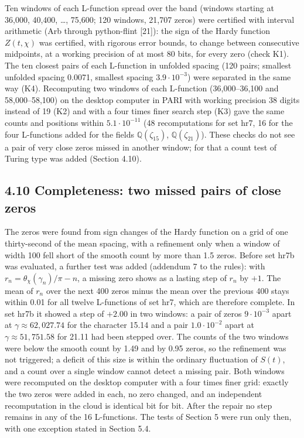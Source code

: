 \documentclass[
  10pt,
]{article}
\begin{document}
Ten windows of each L-function spread over the band (windows starting at
36,000, 40,400, \ldots, 75,600; 120 windows, 21,707 zeros) were
certified with interval arithmetic (Arb through python-flint {[}21{]}):
the sign of the Hardy function \(Z(t, \chi)\) was certified, with
rigorous error bounds, to change between consecutive midpoints, at a
working precision of at most 80 bits, for every zero (check K1). The ten
closest pairs of each L-function in unfolded spacing (120 pairs;
smallest unfolded spacing 0.0071, smallest spacing \(3.9\cdot10^{-3}\))
were separated in the same way (K4). Recomputing two windows of each
L-function (36,000--36,100 and 58,000--58,100) on the desktop computer
in PARI with working precision 38 digits instead of 19 (K2) and with a
four times finer search step (K3) gave the same counts and positions
within \(5.1\cdot10^{-11}\) (48 recomputations for set hr7, 16 for the
four L-functions added for the fields \(\mathbb{Q}(\zeta_{15})\),
\(\mathbb{Q}(\zeta_{21})\)). These checks do not see a pair of very
close zeros missed in another window; for that a count test of Turing
type was added (Section 4.10).

\hypertarget{completeness-two-missed-pairs-of-close-zeros}{%
\subsection{4.10 Completeness: two missed pairs of close
zeros}\label{completeness-two-missed-pairs-of-close-zeros}}

The zeros were found from sign changes of the Hardy function on a grid
of one thirty-second of the mean spacing, with a refinement only when a
window of width 100 fell short of the smooth count by more than 1.5
zeros. Before set hr7b was evaluated, a further test was added (addendum
7 to the rules): with \(r_n = \theta_\chi(\gamma_n)/\pi - n\), a missing
zero shows as a lasting step of \(r_n\) by \(+1\). The mean of \(r_n\)
over the next 400 zeros minus the mean over the previous 400 stays
within 0.01 for all twelve L-functions of set hr7, which are therefore
complete. In set hr7b it showed a step of \(+2.00\) in two windows: a
pair of zeros \(9\cdot10^{-3}\) apart at \(\gamma \approx 62{,}027.74\)
for the character 15.14 and a pair \(1.0\cdot10^{-2}\) apart at
\(\gamma \approx 51{,}751.58\) for 21.11 had been stepped over. The
counts of the two windows were below the smooth count by 1.49 and by
0.95 zeros, so the refinement was not triggered; a deficit of this size
is within the ordinary fluctuation of \(S(t)\), and a count over a
single window cannot detect a missing pair. Both windows were recomputed
on the desktop computer with a four times finer grid: exactly the two
zeros were added in each, no zero changed, and an independent
recomputation in the cloud is identical bit for bit. After the repair no
step remains in any of the 16 L-functions. The tests of Section 5 were
run only then, with one exception stated in Section 5.4.
\end{document}
